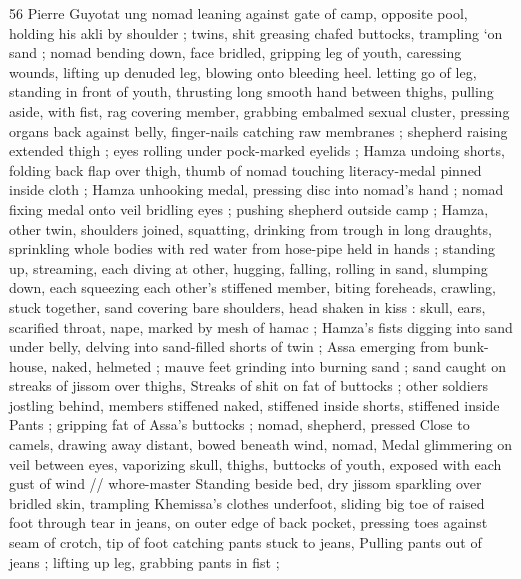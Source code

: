 56 Pierre Guyotat
ung nomad leaning against gate of camp, opposite pool, holding
his akli by shoulder ; twins, shit greasing chafed buttocks, trampling
‘on sand ; nomad bending down, face bridled, gripping leg of youth,
caressing wounds, lifting up denuded leg, blowing onto bleeding
heel. letting go of leg, standing in front of youth, thrusting long
smooth hand between thighs, pulling aside, with fist, rag covering
member, grabbing embalmed sexual cluster, pressing organs back
against belly, finger-nails catching raw membranes ; shepherd raising
extended thigh ; eyes rolling under pock-marked eyelids ; Hamza
undoing shorts, folding back flap over thigh, thumb of nomad
touching literacy-medal pinned inside cloth ; Hamza unhooking
medal, pressing disc into nomad’s hand ; nomad fixing medal onto
veil bridling eyes ; pushing shepherd outside camp ; Hamza, other
twin, shoulders joined, squatting, drinking from trough in long
draughts, sprinkling whole bodies with red water from hose-pipe held
in hands ; standing up, streaming, each diving at other, hugging,
falling, rolling in sand, slumping down, each squeezing each other's
stiffened member, biting foreheads, crawling, stuck together, sand
covering bare shoulders, head shaken in kiss : skull, ears, scarified
throat, nape, marked by mesh of hamac ; Hamza’s fists digging into
sand under belly, delving into sand-filled shorts of twin ; Assa
emerging from bunk-house, naked, helmeted ; mauve feet grinding
into burning sand ; sand caught on streaks of jissom over thighs,
Streaks of shit on fat of buttocks ; other soldiers jostling behind,
members stiffened naked, stiffened inside shorts, stiffened inside
Pants ; gripping fat of Assa’s buttocks ; nomad, shepherd, pressed
Close to camels, drawing away distant, bowed beneath wind, nomad,
Medal glimmering on veil between eyes, vaporizing skull, thighs,
buttocks of youth, exposed with each gust of wind // whore-master
Standing beside bed, dry jissom sparkling over bridled skin,
trampling Khemissa’s clothes underfoot, sliding big toe of raised foot
through tear in jeans, on outer edge of back pocket, pressing toes
against seam of crotch, tip of foot catching pants stuck to jeans,
Pulling pants out of jeans ; lifting up leg, grabbing pants in fist ;

